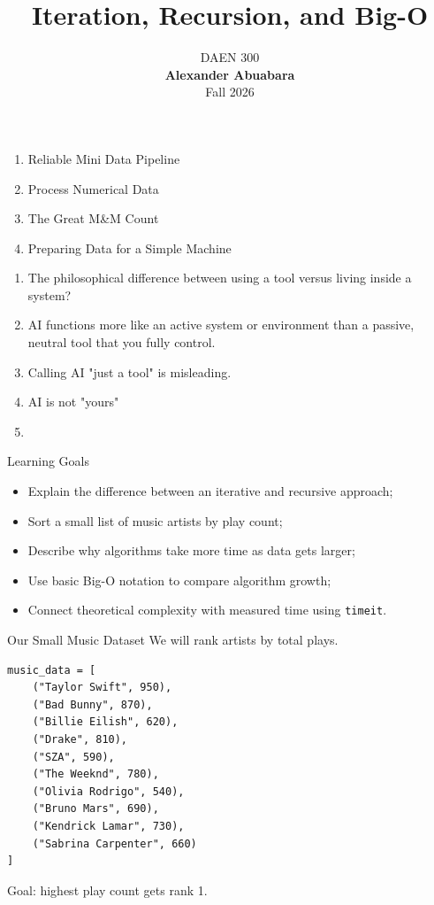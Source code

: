 \documentclass[11pt,aspectratio=43]{beamer}
\title{Iteration, Recursion, and Big-O}
\date{
  \textcolor{aggiemaroon}{
    DAEN 300\\
    \textbf{Alexander Abuabara}\\
    Fall 2026
  }
}
\begin{document}
\begin{frame}
  \titlepage
\end{frame}

\begin{frame}{}
  \begin{enumerate}
    \item Reliable Mini Data Pipeline
    \item Process Numerical Data
    \item The Great M\&M Count
    \item Preparing Data for a Simple Machine
  \end{enumerate}
\end{frame}

\begin{frame}{}
  \begin{enumerate}
    \item The philosophical difference between using a tool versus living inside a system?
    \item AI functions more like an active system or environment than a passive, neutral tool that you fully control.
    \item Calling AI "just a tool" is misleading.
    \item AI is not "yours"
    \item 
  \end{enumerate}
\end{frame}

\begin{frame}{Learning Goals}
  \begin{itemize}
    \item Explain the difference between an iterative and recursive approach;
    \item Sort a small list of music artists by play count;
    \item Describe why algorithms take more time as data gets larger;
    \item Use basic Big-O notation to compare algorithm growth;
    \item Connect theoretical complexity with measured time using \texttt{timeit}.
  \end{itemize}
\end{frame}

\begin{frame}[fragile]{Our Small Music Dataset}
  We will rank artists by total plays.

  \begin{lstlisting}
music_data = [
    ("Taylor Swift", 950),
    ("Bad Bunny", 870),
    ("Billie Eilish", 620),
    ("Drake", 810),
    ("SZA", 590),
    ("The Weeknd", 780),
    ("Olivia Rodrigo", 540),
    ("Bruno Mars", 690),
    ("Kendrick Lamar", 730),
    ("Sabrina Carpenter", 660)
]
  \end{lstlisting}

  \vspace{0.2cm}
  Goal: highest play count gets rank 1.
\end{frame}
\end{document}
